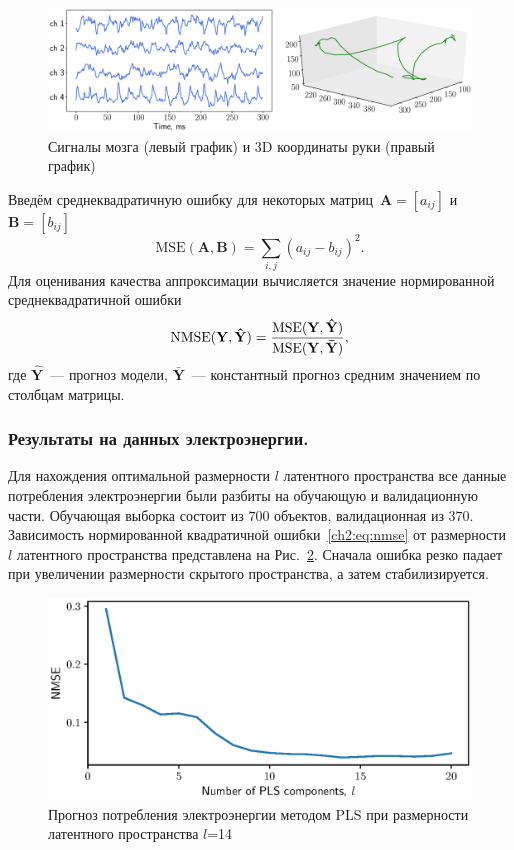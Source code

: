 \begin{figure}[ht]
	\centering
	\includegraphics[width=\linewidth]{figs/ch2/ecog_data}
	\caption{Сигналы мозга (левый график) и 3D координаты руки (правый график)}
	\label{ch2:fig:ecog_data}
\end{figure}

Введём среднеквадратичную ошибку для некоторых матриц~$\mathbf{A} = [a_{ij}]$ и~$\mathbf{B} = [b_{ij}]$
\[
	\text{MSE} (\mathbf{A}, \mathbf{B}) = \sum_{i,j} (a_{ij} - b_{ij})^2.
\]
Для оценивания качества аппроксимации вычисляется значение нормированной среднеквадратичной ошибки
\begin{equation}
	\text{NMSE}(\mathbf{Y},  \mathbf{\hat{Y}}) = \frac{\text{MSE} (\mathbf{Y}, \mathbf{\hat{Y}})}{\text{MSE} (\mathbf{Y}, \mathbf{\bar{Y}})},
	\label{ch2:eq:nmse}
\end{equation}
где $\mathbf{\hat{Y}}$~--- прогноз модели, $\mathbf{\bar{Y}}$~--- константный прогноз средним значением по столбцам матрицы.

\subsubsection{Результаты на данных электроэнергии.}
Для нахождения оптимальной размерности $l$ латентного пространства все данные потребления электроэнергии были разбиты на обучающую и валидационную части. 
Обучающая выборка состоит из $700$ объектов, валидационная из $370$. Зависимость нормированной квадратичной ошибки~\eqref{ch2:eq:nmse} от размерности $l$ латентного пространства представлена на Рис.~\ref{ch2:fig:energy_n_comp}. 
Сначала ошибка резко падает при увеличении размерности скрытого пространства, а затем стабилизируется.

\begin{figure}[ht]
	\centering
	\includegraphics[width=0.75\linewidth]{figs/ch2/energy_n_comp}
	\caption{Прогноз потребления электроэнергии методом PLS при размерности латентного пространства $l$=14}
	\label{ch2:fig:energy_n_comp}
\end{figure}

